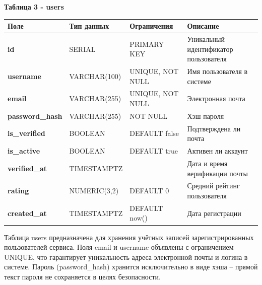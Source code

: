 \documentclass[14pt,a4paper]{extarticle}
\begin{document}
\newpage
\textbf{Таблица 3 - users}

\begin{longtable}[]{@{}
  >{\centering\arraybackslash}p{}
  >{\centering\arraybackslash}p{}
  >{\centering\arraybackslash}p{}
  >{\centering\arraybackslash}p{}@{}}
\toprule\noalign{}
\begin{minipage}[b]{\linewidth}\centering
\textbf{Поле}
\end{minipage} & \begin{minipage}[b]{\linewidth}\centering
\textbf{Тип данных}
\end{minipage} & \begin{minipage}[b]{\linewidth}\centering
\textbf{Ограничения}
\end{minipage} & \begin{minipage}[b]{\linewidth}\centering
\textbf{Описание}
\end{minipage} \\
\midrule\noalign{}
\endhead
\bottomrule\noalign{}
\endlastfoot
\textbf{id} & SERIAL & PRIMARY KEY & Уникальный идентификатор
пользователя \\
\textbf{username} & VARCHAR(100) & UNIQUE, NOT NULL & Имя пользователя в
системе \\
\textbf{email} & VARCHAR(255) & UNIQUE, NOT NULL & Электронная почта \\
\textbf{password\_hash} & VARCHAR(255) & NOT NULL & Хэш пароля \\
\textbf{is\_verified} & BOOLEAN & DEFAULT false & Подтверждена ли
почта \\
\textbf{is\_active} & BOOLEAN & DEFAULT true & Активен ли аккаунт \\
\textbf{verified\_at} & TIMESTAMPTZ & & Дата и время верификации
почты \\
\textbf{rating} & NUMERIC(3,2) & DEFAULT 0 & Средний рейтинг
пользователя \\
\textbf{created\_at} & TIMESTAMPTZ & DEFAULT now() & Дата регистрации \\
\end{longtable}

Таблица users предназначена для хранения учётных записей
зарегистрированных пользователей сервиса. Поля email и username
объявлены с ограничением UNIQUE, что гарантирует уникальность адреса
электронной почты и логина в системе. Пароль (password\_hash) хранится
исключительно в виде хэша -- прямой текст пароля не сохраняется в целях
безопасности.
\end{document}
